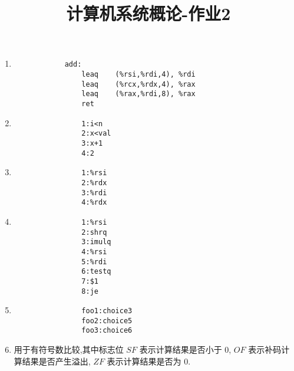 
\usepackage{../../homeworks_preamble}
\title{计算机系统概论-作业2}


    \maketitle
    \begin{enumerate}
        \item 
            \begin{verbatim}
            add:
                leaq    (%rsi,%rdi,4), %rdi
                leaq    (%rcx,%rdx,4), %rax
                leaq    (%rax,%rdi,8), %rax
                ret
            \end{verbatim}
        \item 
            \begin{verbatim}
                1:i<n
                2:x<val
                3:x+1
                4:2
            \end{verbatim}
        \item 
            \begin{verbatim}
                1:%rsi
                2:%rdx
                3:%rdi
                4:%rdx
            \end{verbatim}
        \item 
            \begin{verbatim}
                1:%rsi
                2:shrq
                3:imulq
                4:%rsi
                5:%rdi
                6:testq
                7:$1
                8:je
            \end{verbatim}
        \item 
            \begin{verbatim}
                foo1:choice3
                foo2:choice5
                foo3:choice6
            \end{verbatim}
        \item 用于有符号数比较,其中标志位 $SF$ 表示计算结果是否小于 0, $OF$ 表示补码计算结果是否产生溢出, $ZF$ 表示计算结果是否为 0.


\end{enumerate}
